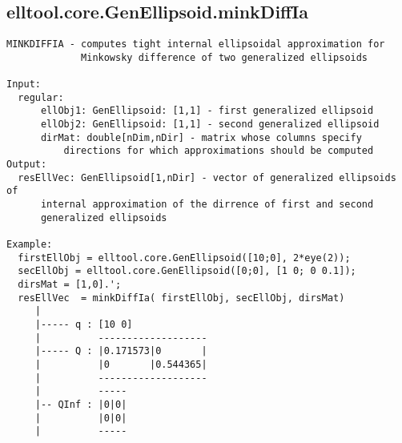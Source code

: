 \subsection{\texorpdfstring{elltool.core.GenEllipsoid.minkDiffIa}{minkDiffIa}}\label{method:elltool.core.GenEllipsoid.minkDiffIa}
\begin{verbatim}
MINKDIFFIA - computes tight internal ellipsoidal approximation for
             Minkowsky difference of two generalized ellipsoids

Input:
  regular:
      ellObj1: GenEllipsoid: [1,1] - first generalized ellipsoid
      ellObj2: GenEllipsoid: [1,1] - second generalized ellipsoid
      dirMat: double[nDim,nDir] - matrix whose columns specify
          directions for which approximations should be computed
Output:
  resEllVec: GenEllipsoid[1,nDir] - vector of generalized ellipsoids of
      internal approximation of the dirrence of first and second
      generalized ellipsoids

Example:
  firstEllObj = elltool.core.GenEllipsoid([10;0], 2*eye(2));
  secEllObj = elltool.core.GenEllipsoid([0;0], [1 0; 0 0.1]);
  dirsMat = [1,0].';
  resEllVec  = minkDiffIa( firstEllObj, secEllObj, dirsMat)
     |
     |----- q : [10 0]
     |          -------------------
     |----- Q : |0.171573|0       |
     |          |0       |0.544365|
     |          -------------------
     |          -----
     |-- QInf : |0|0|
     |          |0|0|
     |          -----
\end{verbatim}
